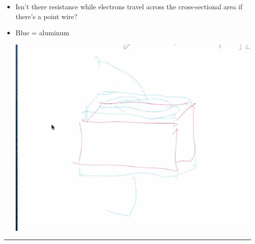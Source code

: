 \documentclass[letterpaper]{article}
\begin{document}
\begin{itemize}
\begin{itemize}
\begin{itemize}
\item Isn't there resistance while electrons travel across the
cross-sectional area if there's a point wire?
\item Blue = aluminum
\begin{center}
\includegraphics[width=.9\linewidth]{KBe20phys201srcResistorCrosssectionalArea.png}
\end{center}
\end{itemize}
\end{itemize}
\end{itemize}

\noindent\rule{\textwidth}{0.5pt}
\end{document}
